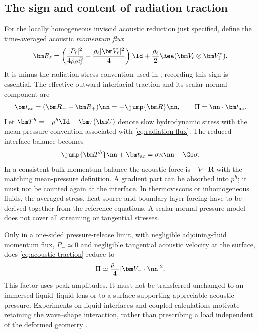 \subsection{The sign and content of radiation traction}
For the locally homogeneous inviscid acoustic reduction just specified, define
the time-averaged acoustic \emph{momentum flux}
\begin{equation}
 \bm R_\ell=
 \left(\frac{|P_\ell|^2}{4\rho_\ell c_\ell^2}
            -\frac{\rho_\ell|\bm V_\ell|^2}{4}\right)\Id
 +\frac{\rho_\ell}{2}\Rea(\bm V_\ell\otimes\bm V_\ell^*).
 \label{eq:radiation-flux}
\end{equation}
It is minus the radiation-stress convention used in
\cite{chesneau2022}; recording this sign is essential. The effective outward
interfacial traction and its scalar normal component are
\begin{equation}
 \bm t_{\rm ac}=(\bm R_- -\bm R_+)\nn=-\jump{\bm R}\nn,
 \qquad \Pi=\nn\cdot\bm t_{\rm ac}.
 \label{eq:acoustic-traction}
\end{equation}
Let $\bm T^h=-p^h\Id+\bm\tau(\bm U)$ denote slow hydrodynamic stress with the
mean-pressure convention associated with \cref{eq:radiation-flux}. The reduced
interface balance becomes
\begin{equation}
 \jump{\bm T^h}\nn+\bm t_{\rm ac}
       =\sigma\kappa\nn-\Gs\sigma.
 \label{eq:averaged-jump}
\end{equation}
In a consistent bulk momentum balance the acoustic force is
$-\nabla\cdot\bm R$ with the matching mean-pressure definition. A gradient
part can be absorbed into $p^h$; it must not be counted again at the interface.
In thermoviscous or inhomogeneous fluids, the averaged stress, heat source and
boundary-layer forcing have to be derived together from the reference
equations. A scalar normal pressure model does not cover all streaming or
tangential stresses.

Only in a one-sided pressure-release limit, with negligible adjoining-fluid
momentum flux, $P_-\simeq0$ and negligible tangential acoustic velocity at the
surface, does \cref{eq:acoustic-traction} reduce to
\begin{equation}
 \Pi\simeq\frac{\rho_-}{4}|\bm V_-\cdot\nn|^2.
 \label{eq:pressure-release-limit}
\end{equation}
This factor uses peak amplitudes. It must not be transferred unchanged to an
immersed liquid--liquid lens or to a surface supporting appreciable acoustic
pressure. Experiments on liquid interfaces and coupled calculations motivate
retaining the wave--shape interaction, rather than prescribing a load
independent of the deformed geometry \cite{bertin2012,chesneau2022,sisombat2023}.

